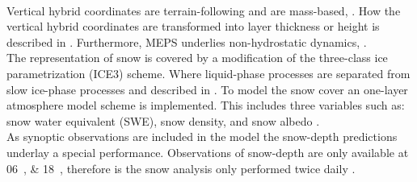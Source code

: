 \\
Vertical hybrid coordinates are terrain-following and are mass-based, \citep{muller_arome-metcoop:_2017}. How the vertical hybrid coordinates are transformed into layer thickness or height is described in . Furthermore, MEPS underlies non-hydrostatic dynamics, \cite{metcoop_wiki_description_2017}.
\\
The representation of snow is covered by a modification of the three-class ice parametrization (ICE3) scheme. Where liquid-phase processes are separated from slow ice-phase processes and described in . To model the snow cover an one-layer atmosphere model scheme is implemented. This includes three variables such as: snow water equivalent (SWE), snow density, and snow albedo \citep{muller_arome-metcoop:_2017}.
\\
As synoptic observations are included in the model the snow-depth predictions underlay a special performance. Observations of snow-depth are only available at \SIlist{06;18}{\UTC}, therefore is the snow analysis only performed twice daily \citep{muller_arome-metcoop:_2017, homleid_verification_2016}. 
%
